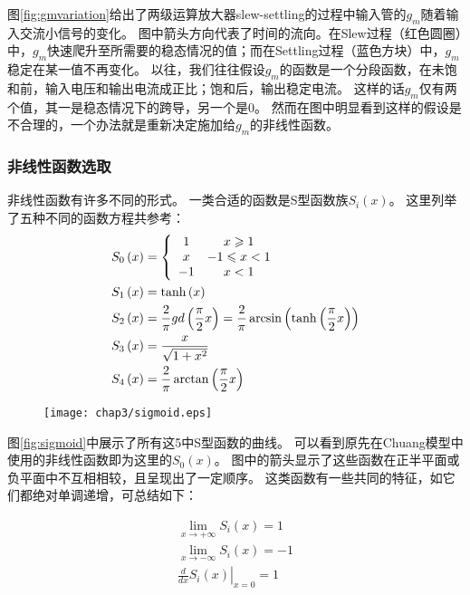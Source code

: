 图\ref{fig:gmvariation}给出了两级运算放大器slew-settling的过程中输入管的$g_m$随着输入交流小信号的变化。
图中箭头方向代表了时间的流向。在Slew过程（红色圆圈）中，$g_m$快速爬升至所需要的稳态情况的值；而在Settling过程（蓝色方块）中，$g_m$稳定在某一值不再变化。
以往，我们往往假设$g_m$的函数是一个分段函数，在未饱和前，输入电压和输出电流成正比；饱和后，输出稳定电流。
这样的话$g_m$仅有两个值，其一是稳态情况下的跨导，另一个是$0$。
然而在图中明显看到这样的假设是不合理的，一个办法就是重新决定施加给$g_m$的非线性函数。

\subsubsection{非线性函数选取}

非线性函数有许多不同的形式。
一类合适的函数是S型函数族$S_i\left(x\right)$。
这里列举了五种不同的函数方程共参考：
\begin{align}
	&{S_0}\left( x \right) = \left\{ {\begin{array}{*{20}{c}}1 & {x \geqslant 1}  \\x & { - 1 \leqslant x < 1}  \\{ - 1} & {x < 1}  \\\end{array} } \right. \\
	&{S_1}\left( x \right) = \tanh \left( x \right) \hfill \\
	&{S_2}\left( x \right) = \frac{2}{\pi }gd\left( {\frac{\pi }	{2}x} \right) = \frac{2}{\pi }\arcsin \left( {\tanh \left( {\frac{\pi }{2}x} \right)} \right)\\
	&{S_3}\left( x \right) = \frac{x}{{\sqrt {1 + {x^2}} }}\\
	&{S_4}\left( x \right) = \frac{2}{\pi }\arctan \left( {\frac{\pi }{2}x} \right)
\end{align}

\begin{figure}[!htp]
	\centering
	\texttt{[image: chap3/sigmoid.eps]}
\end{figure}

图\ref{fig:sigmoid}中展示了所有这5中S型函数的曲线。
可以看到原先在Chuang模型中使用的非线性函数即为这里的$S_0\left(x\right)$。
图中的箭头显示了这些函数在正半平面或负平面中不互相相较，且呈现出了一定顺序。
这类函数有一些共同的特征，如它们都绝对单调递增，可总结如下：

\begin{eqnarray}
	\mathop {\lim }\limits_{x \to  + \infty } {S_i}\left( x \right) = 1\\
	\mathop {\lim }\limits_{x \to  - \infty } {S_i}\left( x \right) = -1\\
	{\left. {\frac{d}{{dx}}{S_i}\left( x \right)} \right|_{x = 0}} = 1
\end{eqnarray}

